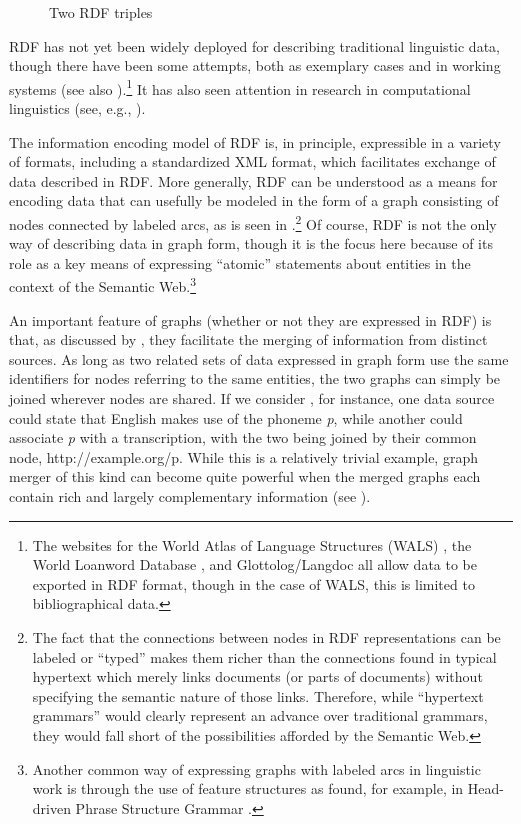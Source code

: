 \begin{figure}[ht]
\centering
{}
\caption{Two RDF triples }
\label{RDFExample}
\end{figure}

RDF has not yet been widely deployed for describing traditional linguistic data,
though there have been some attempts, both as exemplary cases \citep{Simons:2005}
and in working systems \citep{GoodParker:2006} (see also
).{\footnote{The websites for the World
Atlas of Language Structures (WALS) \citep{WALS:2011}, the World Loanword
Database \citep{WOLD}, and Glottolog/Langdoc \citep{Nordhoff:2012} all allow
data to be exported in RDF format,
though in the case of WALS, this is limited to bibliographical data.}} It has
also seen attention in research in computational linguistics (see, e.g.,
).

The information encoding model of RDF is, in principle, expressible in a variety
of formats, including a standardized XML format, which facilitates exchange of
data described in RDF. More generally, RDF can be understood as a means for
encoding data that can usefully be modeled in the form of a graph consisting of
nodes connected by labeled arcs, as is seen in .{\footnote{The
fact that the connections between nodes in RDF representations can be labeled or
``typed'' makes them richer than the connections found in typical hypertext
which merely links documents (or parts of documents) without specifying the
semantic nature of those links. Therefore, while ``hypertext grammars''
\citep[29]{EvansDench:2006} would clearly represent an advance over traditional
grammars, they would fall short of the possibilities afforded by the Semantic
Web.}} Of course, RDF is not the only way of describing data in graph form,
though it is the focus here because of its role as a key means of expressing
``atomic'' statements about entities in the context of the Semantic
Web.{\footnote{Another common way of expressing graphs with labeled arcs in
linguistic work is through the use of feature structures as found, for example,
in Head-driven Phrase Structure Grammar \citep[50--51]{SWB:2003}.}}

An important feature of graphs (whether or not they are expressed in RDF) is
that, as discussed by , they facilitate the merging
of information from distinct sources. As long as two related sets of data
expressed in graph form use the same identifiers for nodes referring to the same
entities, the two graphs can simply be joined wherever nodes are shared. If we
consider , for instance, one data source could state that English
makes use of the phoneme \emph{p}, while another could associate \emph{p} with a
transcription, with the two being joined by their common node,
http://example.org/p. While this is a relatively trivial example, graph merger
of this kind can become quite powerful when the merged graphs each contain rich
and largely complementary information (see ).

